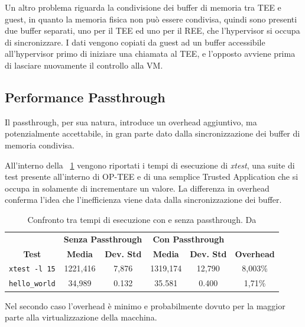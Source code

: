 \documentclass[12pt,italian]{report}
\begin{document}
	Un altro problema riguarda la condivisione dei buffer di memoria tra TEE e guest, in quanto la memoria fisica non può essere condivisa, quindi sono presenti due buffer separati, uno per il TEE ed uno per il REE, che l'hypervisor si occupa di sincronizzare. I dati vengono copiati da guest ad un buffer accessibile all'hypervisor primo di iniziare una chiamata al TEE, e l'opposto avviene prima di lasciare nuovamente il controllo alla VM. 

	\subsection{Performance Passthrough}
	\label{subsec:perf-pass}
	Il passthrough, per sua natura, introduce un overhead aggiuntivo, ma potenzialmente accettabile, in gran parte dato dalla sincronizzazione dei buffer di memoria condivisa. 
	
	All'interno della \tablename~\ref{tab:performance_pass} vengono riportati i tempi di esecuzione di \textit{xtest}, una suite di test presente all'interno di OP-TEE e di una semplice Trusted Application che si occupa in solamente di incrementare un valore. La differenza in overhead conferma l'idea che l'inefficienza viene data dalla sincronizzazione dei buffer.

	\begin{table}[h]
		\begin{tabular}{cccccc}
		\multicolumn{1}{c|}{}  & \multicolumn{2}{c|}{\textbf{Senza Passthrough}} & \multicolumn{2}{c|}{\textbf{Con Passthrough}} &  \\
		\multicolumn{1}{c|}{\multirow{-2}{*}{\textbf{Test}}} &
		  \multicolumn{1}{c|}{\textbf{Media}} &
		  \multicolumn{1}{c|}{\textbf{Dev. Std}} &
		  \multicolumn{1}{c|}{\textbf{Media}} &
		  \multicolumn{1}{c|}{\textbf{Dev. Std}} &
		  \multirow{-2}{*}{\textbf{Overhead}} \\ \hline
			\texttt{xtest -l 15}    & 1221,416  & 7,876 & 1319,174 & 12,790 & 8,003\% \\
			\texttt{hello\_world}   & 34,989    & 0.132 & 35.581 & 0.400 & 1,71\% \\
		\end{tabular}
		\caption{
			Confronto tra tempi di esecuzione con e senza passthrough. Da \cite{tesi_cutecchia}
		}
		\label{tab:performance_pass}
	\end{table}

	Nel secondo caso l'overhead è minimo e probabilmente dovuto per la maggior parte alla virtualizzazione della macchina.
\end{document}
